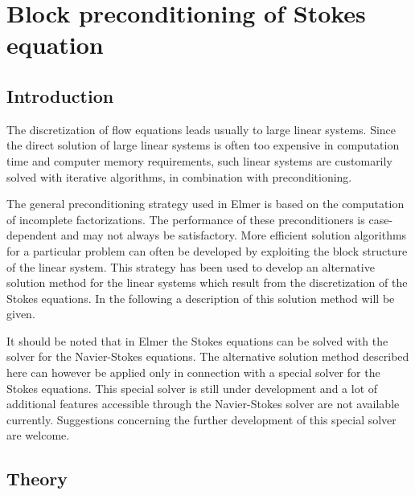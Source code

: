 \chapter{Block preconditioning of Stokes equation}
\noindent
{}
\begin{versiona}

\section{Introduction}

The discretization of flow equations leads usually to large linear systems. Since
the direct solution of large linear systems is often too expensive in computation time 
and computer memory requirements, such linear systems are customarily solved
with iterative algorithms, in combination with preconditioning.

The general preconditioning strategy used in Elmer is based on the computation of 
incomplete factorizations. The performance of these preconditioners 
is case-dependent and may
not always be satisfactory. More efficient solution algorithms for a particular
problem can often be developed by exploiting the block structure of the 
linear system. This strategy has been used to develop an alternative
solution method for the linear systems which result from the discretization
of the Stokes equations. In the following a description of this solution 
method will be given.

It should be noted that in Elmer the Stokes equations can be solved with the solver 
for the Navier-Stokes equations. The alternative
solution method described here can however be applied only in connection with 
a special solver for the Stokes equations. This special solver is still
under development and a lot of additional features accessible through 
the Navier-Stokes solver are not available currently.       
Suggestions concerning the further development of this special solver are welcome.   


\section{Theory}


\end{versiona}
